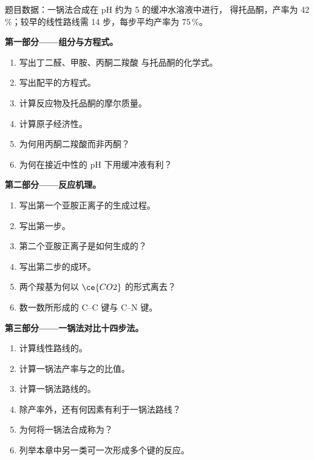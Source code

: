 \begin{problem}
\label{pb:b3:total-synthesis:1}
题目数据：一锅法合成在 pH 约为 5 的缓冲水溶液中进行，
得托品酮，产率为 42\,\%；较早的线性路线需 14 步，每步平均产率为 75\,\%。

\medskip\noindent\textbf{第一部分——组分与方程式。}
\begin{enumerate}
  \item 写出丁二醛、甲胺、丙酮二羧酸
        与托品酮的化学式。
  \item 写出配平的方程式。
  \item 计算反应物及托品酮的摩尔质量。
  \item 计算原子经济性。
  \item 为何用丙酮二羧酸而非丙酮？
  \item 为何在接近中性的 pH 下用缓冲液有利？
\end{enumerate}

\medskip\noindent\textbf{第二部分——反应机理。}
\begin{enumerate}[resume]
  \item 写出第一个亚胺正离子的生成过程。
  \item 写出第一步。
  \item 第二个亚胺正离子是如何生成的？
  \item 写出第二步的成环。
  \item 两个羧基为何以 $\ce{CO2}$ 的形式离去？
  \item 数一数所形成的 C--C 键与 C--N 键。
\end{enumerate}

\medskip\noindent\textbf{第三部分——一锅法对比十四步法。}
\begin{enumerate}[resume]
  \item 计算线性路线的。
  \item 计算一锅法产率与之的比值。
  \item 计算一锅法路线的。
  \item 除产率外，还有何因素有利于一锅法路线？
  \item 为何将一锅法合成称为？
  \item 列举本章中另一类可一次形成多个键的反应。
\end{enumerate}


\end{problem}
